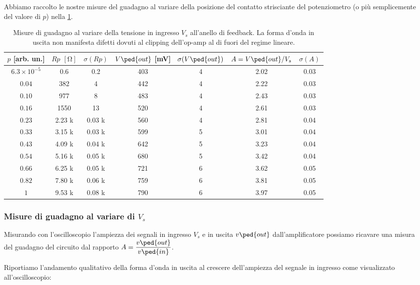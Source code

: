 \documentclass[10pt, a4paper, italian]{article}
\begin{document}
Abbiamo raccolto le nostre misure del guadagno al variare della posizione del
contatto strisciante del potenziometro (o più semplicemente del valore di $p$)
nella \cref{tab: VoutRp}.
\begin{table}[htbp]
\centering
\begin{tabular}{ccccccc}
\toprule
$p$ [arb. un.] & $Rp$ $[\si{\ohm}]$ & $\sigma(Rp)$ & $V\ped{out}$ [mV] &
$\sigma(V\ped{out})$ & $A = V\ped{out}/V_s$ & $\sigma(A)$ \\
\midrule
\midrule
$6.3 \times 10^{-5}$  	& 0.6     & 0.2 	& 403        & 4 & 2.02 & 0.03	\\
$0.04$   				& 382     & 4 		& 442        & 4 & 2.22	& 0.03	\\
$0.10$   				& 977     & 8 		& 483        & 4 & 2.43 & 0.03	\\
$0.16$   				& 1550    & 13 		& 520        & 4 & 2.61 & 0.03	\\
$0.23$   				& 2.23 k  & 0.03 k 	& 560        & 4 & 2.81 & 0.04	\\
$0.33$   				& 3.15 k  & 0.03 k	& 599        & 5 & 3.01 & 0.04	\\
$0.43$   				& 4.09 k  & 0.04 k	& 642        & 5 & 3.23 & 0.04	\\
$0.54$   				& 5.16 k  & 0.05 k	& 680        & 5 & 3.42 & 0.04	\\
$0.66$   				& 6.25 k  & 0.05 k	& 721        & 6 & 3.62 & 0.05	\\
$0.82$   				& 7.80 k  & 0.06 k	& 759        & 6 & 3.81 & 0.05	\\
$1$             		& 9.53 k  & 0.08 k	& 790        & 6 & 3.97 & 0.05	\\         
\bottomrule
\end{tabular}
\caption{Misure di guadagno al variare della tensione in ingresso $V_s$
all'anello di feedback. La forma d'onda in uscita non manifesta difetti
dovuti al clipping dell'op-amp al di fuori del regime lineare.
\label{tab: VoutRp}}
\end{table}

\subsubsection{Misure di guadagno al variare di $V_s$}
Misurando con l'oscilloscopio l'ampiezza dei segnali in ingresso $V_s$
e in uscita $v\ped{out}$ dall'amplificatore possiamo ricavare una misura del
guadagno del circuito dal rapporto $A = \dfrac{v\ped{out}}{v\ped{in}}$.

Riportiamo l'andamento qualitativo della forma d'onda in uscita al crescere
dell'ampiezza del segnale in ingresso come visualizzato all'oscilloscopio:
\end{document}
